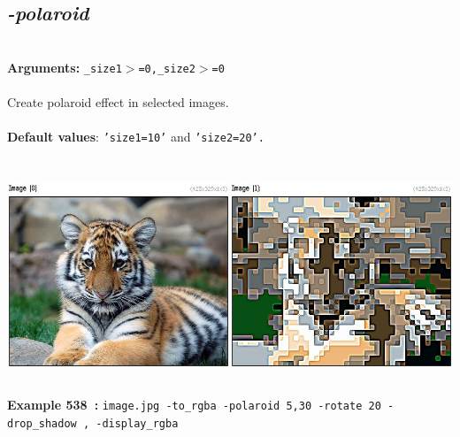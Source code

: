 \documentclass[a4paper,11pt,twoside]{book}
\begin{document}
\subsection{\emph{-polaroid} }\vspace*{-0.5em}
~\\\textbf{Arguments: } 
{\small \texttt{\_size1$>$=0,\_size2$>$=0}}\\~\\
Create polaroid effect in selected images.
~\\~\\\textbf{Default values}: {\small \texttt{'size1=10'} and \texttt{'size2=20'.}}
\begin{center}\includegraphics[keepaspectratio=true,height=7cm,width=\textwidth]{img/gmic_def538.jpg}\\
{\footnotesize \textbf{Example 538~:} \texttt{image.jpg -to\_rgba -polaroid 5,30 -rotate 20 -drop\_shadow , -display\_rgba}}
\end{center}
\end{document}
